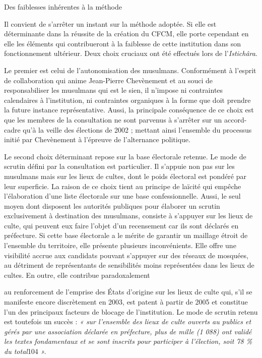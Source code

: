 Des faiblesses inhérentes à la méthode


Il convient de s'arrêter un instant sur la méthode adoptée. Si elle est
déterminante dans la réussite de la création du CFCM, elle porte
cependant en elle les éléments qui contribueront à la faiblesse de cette
institution dans son fonctionnement ultérieur. Deux choix cruciaux ont
été effectués lors de l'\emph{Istichâra}.

Le premier est celui de l'autonomisation des musulmans. Conformément à
l'esprit de collaboration qui anime Jean-Pierre Chevènement et au souci
de responsabiliser les musulmans qui est le sien, il n'impose ni
contraintes calendaires à l'institution, ni contraintes organiques à la
forme que doit prendre la future instance représentative. Aussi, la
principale conséquence de ce choix est que les membres de la
consultation ne sont parvenus à s'arrêter sur un accord-cadre qu'à la
veille des élections de 2002 ; mettant ainsi l'ensemble du processus
initié par Chevènement à l'épreuve de l'alternance politique.

Le second choix déterminant repose sur la base électorale retenue. Le
mode de scrutin défini par la consultation est particulier. Il s'appuie
non pas sur les musulmans mais sur les lieux de cultes, dont le poids
électoral est pondéré par leur superficie. La raison de ce choix tient
au principe de laïcité qui empêche l'élaboration d'une liste électorale
sur une base confessionnelle. Aussi, le seul moyen dont disposent les
autorités publiques pour élaborer un scrutin exclusivement à destination
des musulmans, consiste à s'appuyer sur les lieux de culte, qui peuvent
eux faire l'objet d'un recensement car ils sont déclarés en préfecture.
Si cette base électorale a le mérite de garantir un maillage étroit de
l'ensemble du territoire, elle présente plusieurs inconvénients. Elle
offre une visibilité accrue aux candidats pouvant s'appuyer sur des
réseaux de mosquées, au détriment de représentants de sensibilités moins
représentées dans les lieux de cultes. En outre, elle contribue
paradoxalement



au renforcement de l'emprise des États d'origine sur les lieux de culte
qui, s'il se manifeste encore discrètement en 2003, est patent à partir
de 2005 et constitue l'un des principaux facteurs de blocage de
l'institution. Le mode de scrutin retenu est toutefois un succès :
\emph{« sur l'ensemble des lieux de culte ouverts au publics et gérés
par une association déclarée en préfecture, plus de mille (1 088) ont
validé les textes fondamentaux et se sont inscrits pour participer à
l'élection, soit 78 \% du total}104 \emph{».}


